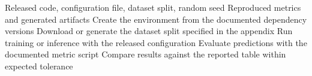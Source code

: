 \begin{algorithm}[t]
  \caption{Appendix Reproducibility Procedure}
  \label{alg:app_reproducibility}
  \begin{algorithmic}[1]
    \Require Released code, configuration file, dataset split, random seed
    \Ensure Reproduced metrics and generated artifacts
    \State Create the environment from the documented dependency versions
    \State Download or generate the dataset split specified in the appendix
    \State Run training or inference with the released configuration
    \State Evaluate predictions with the documented metric script
    \State Compare results against the reported table within expected tolerance
  \end{algorithmic}
\end{algorithm}
